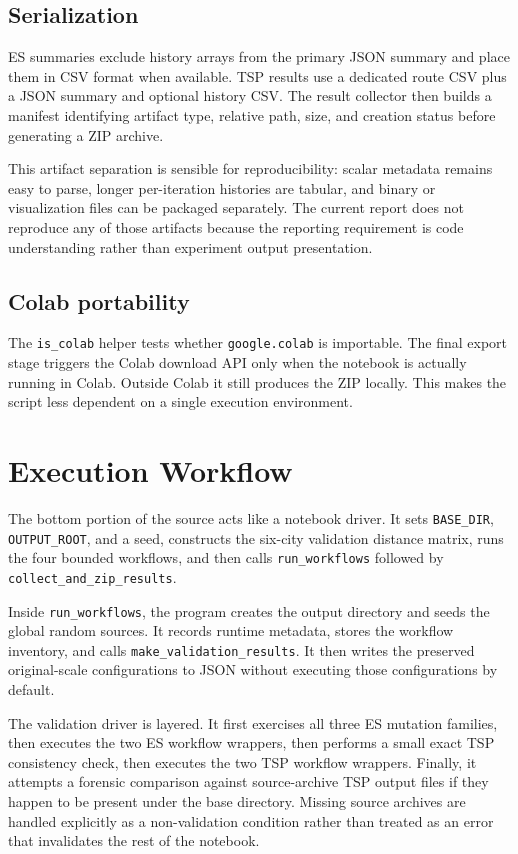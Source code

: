 \documentclass[11pt,a4paper]{article}
\newcommand{\code}[1]{\texttt{#1}}
\begin{document}
\subsection{Serialization}
ES summaries exclude history arrays from the primary JSON summary and place them in CSV format when available. TSP results use a dedicated route CSV plus a JSON summary and optional history CSV. The result collector then builds a manifest identifying artifact type, relative path, size, and creation status before generating a ZIP archive.

This artifact separation is sensible for reproducibility: scalar metadata remains easy to parse, longer per-iteration histories are tabular, and binary or visualization files can be packaged separately. The current report does not reproduce any of those artifacts because the reporting requirement is code understanding rather than experiment output presentation.

\subsection{Colab portability}
The \code{is\_colab} helper tests whether \code{google.colab} is importable. The final export stage triggers the Colab download API only when the notebook is actually running in Colab. Outside Colab it still produces the ZIP locally. This makes the script less dependent on a single execution environment.

\section{Execution Workflow}
The bottom portion of the source acts like a notebook driver. It sets \code{BASE\_DIR}, \code{OUTPUT\_ROOT}, and a seed, constructs the six-city validation distance matrix, runs the four bounded workflows, and then calls \code{run\_workflows} followed by \code{collect\_and\_zip\_results}.

Inside \code{run\_workflows}, the program creates the output directory and seeds the global random sources. It records runtime metadata, stores the workflow inventory, and calls \code{make\_validation\_results}. It then writes the preserved original-scale configurations to JSON without executing those configurations by default.

The validation driver is layered. It first exercises all three ES mutation families, then executes the two ES workflow wrappers, then performs a small exact TSP consistency check, then executes the two TSP workflow wrappers. Finally, it attempts a forensic comparison against source-archive TSP output files if they happen to be present under the base directory. Missing source archives are handled explicitly as a non-validation condition rather than treated as an error that invalidates the rest of the notebook.
\end{document}
